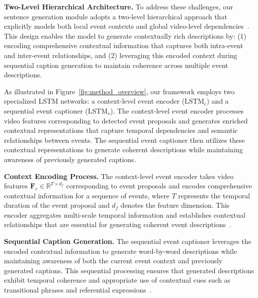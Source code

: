 \textbf{Two-Level Hierarchical Architecture.}
To address these challenges, our sentence generation module adopts a two-level hierarchical approach that explicitly models both local event contexts and global video-level dependencies~\cite{pan2016hierarchical,baraldi2017hierarchical}. This design enables the model to generate contextually rich descriptions by: (1) encoding comprehensive contextual information that captures both intra-event and inter-event relationships, and (2) leveraging this encoded context during sequential caption generation to maintain coherence across multiple event descriptions.

As illustrated in Figure~\ref{fig:method_overview}, our framework employs two specialized LSTM networks: a context-level event encoder ($\text{LSTM}_c$) and a sequential event captioner ($\text{LSTM}_s$). The context-level event encoder processes video features corresponding to detected event proposals and generates enriched contextual representations that capture temporal dependencies and semantic relationships between events. The sequential event captioner then utilizes these contextual representations to generate coherent descriptions while maintaining awareness of previously generated captions.

\textbf{Context Encoding Process.}
The context-level event encoder takes video features $\mathbf{F}_v \in \mathbb{R}^{T \times d_f}$ corresponding to event proposals and encodes comprehensive contextual information for a sequence of events, where $T$ represents the temporal duration of the event proposal and $d_f$ denotes the feature dimension. This encoder aggregates multi-scale temporal information and establishes contextual relationships that are essential for generating coherent event descriptions~\cite{Chen2020-di,Wang2021-xe}.

\textbf{Sequential Caption Generation.}
The sequential event captioner leverages the encoded contextual information to generate word-by-word descriptions while maintaining awareness of both the current event context and previously generated captions. This sequential processing ensures that generated descriptions exhibit temporal coherence and appropriate use of contextual cues such as transitional phrases and referential expressions~\cite{Huang2020-as}.

